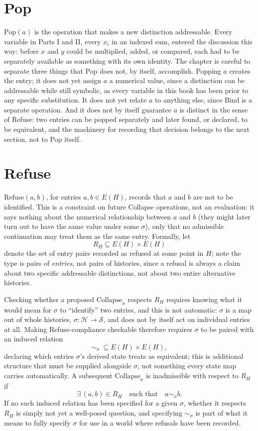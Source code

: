 \documentclass[11pt]{book}
\begin{document}
\section{Pop}

$\mathrm{Pop}(a)$ is the operation that makes a new distinction addressable. Every variable in Parts I and II, every $x_i$ in an indexed sum, entered the discussion this way: before $x$ and $y$ could be multiplied, added, or compared, each had to be separately available as something with its own identity. The chapter is careful to separate three things that Pop does not, by itself, accomplish. Popping $a$ creates the entry; it does not yet assign $a$ a numerical value, since a distinction can be addressable while still symbolic, as every variable in this book has been prior to any specific substitution. It does not yet relate $a$ to anything else, since Bind is a separate operation. And it does not by itself guarantee $a$ is distinct in the sense of Refuse: two entries can be popped separately and later found, or declared, to be equivalent, and the machinery for recording that decision belongs to the next section, not to Pop itself.

\section{Refuse}

$\mathrm{Refuse}(a,b)$, for entries $a,b\in E(H)$, records that $a$ and $b$ are not to be identified. This is a constraint on future Collapse operations, not an evaluation: it says nothing about the numerical relationship between $a$ and $b$ (they might later turn out to have the same value under some $\sigma$), only that no admissible continuation may treat them as the same entry. Formally, let
\[
R_H \subseteq E(H) \times E(H)
\]
denote the set of entry pairs recorded as refused at some point in $H$; note the type is pairs of \emph{entries}, not pairs of histories, since a refusal is always a claim about two specific addressable distinctions, not about two entire alternative histories.

Checking whether a proposed $\mathrm{Collapse}_\sigma$ respects $R_H$ requires knowing what it would mean for $\sigma$ to ``identify'' two entries, and this is not automatic: $\sigma$ is a map out of whole histories, $\sigma:\mathcal H\to\mathcal S$, and does not by itself act on individual entries at all. Making Refuse-compliance checkable therefore requires $\sigma$ to be paired with an induced relation
\[
\sim_\sigma \ \subseteq E(H)\times E(H),
\]
declaring which entries $\sigma$'s derived state treats as equivalent; this is additional structure that must be supplied alongside $\sigma$, not something every state map carries automatically. A subsequent $\mathrm{Collapse}_\sigma$ is inadmissible with respect to $R_H$ if
\[
\exists\, (a,b)\in R_H \quad\text{such that}\quad a \sim_\sigma b.
\]
If no such induced relation has been specified for a given $\sigma$, whether it respects $R_H$ is simply not yet a well-posed question, and specifying $\sim_\sigma$ is part of what it means to fully specify $\sigma$ for use in a world where refusals have been recorded.
\end{document}
